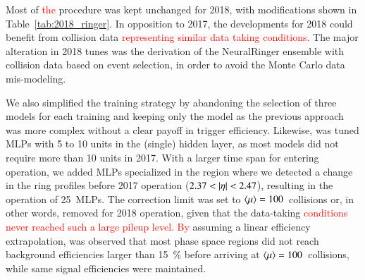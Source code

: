 Most of \textcolor{red}{the} procedure was kept unchanged for 2018, with modifications shown in
Table~\ref{tab:2018_ringer}.
In opposition to 2017, the developments for 2018
could benefit from collision data 
\textcolor{red}{representing similar data taking conditions.}
The major alteration in 2018 tunes was the derivation of the NeuralRinger ensemble with collision data based on \Zee{} \tnp{} event selection, in order to avoid the Monte Carlo data mis-modeling.

We also simplified the training strategy by abandoning the selection of three
models for each training and keeping only the \spmax{} model as the previous approach was more complex without a clear
payoff in trigger efficiency.
Likewise, was tuned MLPs with 5 to 10 units in the (single) hidden layer, as most models did not require
more than 10 units in 2017. With a larger time span for entering operation, we
added MLPs specialized in the region where we detected a change in the ring
profiles before 2017 operation ($2.37<\abseta<2.47$), resulting in the operation of
\SI{25}{MLPs}. The correction limit was set to
$\langle \mu \rangle{}=100$~collisions or, in other words, removed for 2018 operation, given
that the data-taking 
\textcolor{red}{conditions never reached such a large pileup level. By}
assuming a linear efficiency extrapolation,%
was observed that most phase space regions did not reach background efficiencies
larger than \SI{15}{\%} before arriving at $\langle \mu \rangle=100$~collisions, while same
signal efficiencies were maintained.






